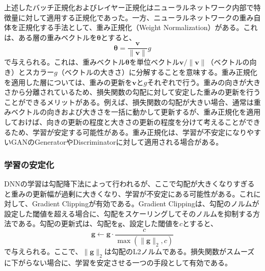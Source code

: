\documentclass[12pt]{jarticle}
\numberwithin{equation}{section}    %
\numberwithin{figure}{section}      %
\numberwithin{table}{section}      %
\begin{document}
上述したバッチ正規化およびレイヤー正規化はニューラルネットワーク内部で特徴量に対して適用する正規化であった。一方、ニューラルネットワークの重み自体を正規化する手法として、重み正規化（Weight Normalization）\cite{salimans2016weight}がある。これは、ある層の重みベクトルを$\bm{\theta}$とすると、
\begin{equation}
    \bm{\theta} = \frac{\bm{v}}{\| \bm{v} \|} g
\end{equation}
で与えられる。これは、重みベクトル$\bm{\theta}$を単位ベクトル$\bm{v} / \| \bm{v} \|$（ベクトルの向き）とスカラー$g$（ベクトルの大きさ）に分解することを意味する。重み正規化を適用した層については、重みの更新を$\bm{v}$と$g$それぞれで行う。重みの向きが大きさから分離されているため、損失関数の勾配に対して安定した重みの更新を行うことができるメリットがある。例えば、損失関数の勾配が大きい場合、通常は重みベクトルの向きおよび大きさを一括に動かして更新するが、重み正規化を適用しておけば、向きの更新の程度と大きさの更新の程度を分けて考えることができるため、学習が安定する可能性がある。重み正規化は、学習が不安定になりやすいGANのGeneratorやDiscriminatorに対して適用される場合がある。

\subsubsection{学習の安定化}
DNNの学習は勾配降下法によって行われるが、ここで勾配が大きくなりすぎると重みの更新幅が過剰に大きくなり、学習が不安定にある可能性がある。これに対して、Gradient Clippingが有効である。Gradient Clippingは、勾配のノルムが設定した閾値を超える場合に、勾配をスケーリングしてそのノルムを抑制する方法である。勾配の更新式は、勾配を$\bm{g}$、設定した閾値を$c$とすると、
\begin{equation}
    \bm{g} \gets \bm{g} \cdot \frac{c}{\max (\|\bm{g}\|_{2}, c)}
\end{equation}
で与えられる。ここで、$\|\bm{g}\|_{2}$は勾配のL2ノルムである。損失関数がスムーズに下がらない場合に、学習を安定させる一つの手段として有効である。
\end{document}
